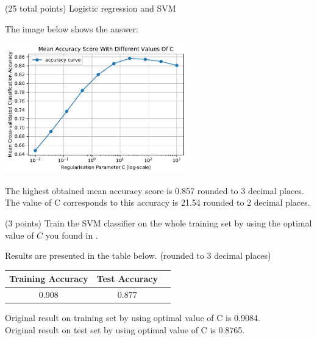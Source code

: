 \documentclass[12pt]{article}
\begin{document}
\begin{question}{(25 total points) Logistic regression and SVM}
\begin{subquestion}
      \begin{answerbox}{30em}
         The image below shows the answer:
         \begin{center}
         \includegraphics[width=0.6\textwidth]{MASC.pdf}
         \end{center}
         The highest obtained mean accuracy score is 0.857 rounded to 3 decimal places.\\
         The value of C corresponds to this accuracy is 21.54 rounded to 2 decimal places.
      \end{answerbox}
  


   \end{subquestion}
   \begin{subquestion}{(3 points)
       Train the SVM classifier on the whole training set by using the
       optimal value of $C$ you found in . 
     } \label{Q2.6}


       

      \begin{answerbox}{10em}
      Results are presented in the table below. (rounded to 3 decimal places)
         \begin{center}
         \begin{tabular}{|c|c|c|}
         \hline
         Training Accuracy & Test Accuracy \\
         \hline
         0.908 & 0.877 \\
         \hline
         \end{tabular}
         \end{center}
      Original result on training set by using optimal value of C is 0.9084.\\
      Original result on test set by using optimal value of C is 0.8765.
      \end{answerbox}
  


   \end{subquestion}
%
%

\end{question}
\clearpage
%
%
\end{document}
